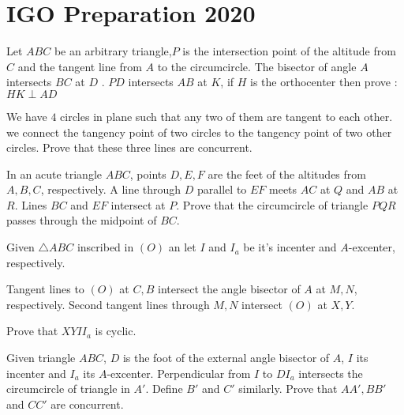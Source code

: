 \section*{IGO Preparation 2020}

\prob{}
{}{}{
    Let $ABC$ be an arbitrary triangle,$P$ is the intersection point of the altitude from
    $C$ and the tangent line from $A$ to the circumcircle. The bisector of angle $A$
    intersects $BC$ at $D$ . $PD$ intersects $AB$ at $K$, if $H$ is the orthocenter then
    prove : $HK\perp AD$
}

\prob{}
{}{}{
    We have $4$ circles in plane such that any two of them are tangent to each other. we
    connect the tangency point of two circles to the tangency point of two other circles.
    Prove that these three lines are concurrent.
}

\prob{}
{}{}{
    In an acute triangle $ABC$, points $D,E,F$ are the feet of the altitudes from $A,B,C$,
    respectively. A line through $D$ parallel to $EF$ meets $AC$ at $Q$ and $AB$ at $R$.
    Lines $BC$ and $EF$ intersect at $P$. Prove that the circumcircle of triangle $PQR$
    passes through the midpoint of $BC$.
}


\prob{}
{}{}{
    Given $\triangle ABC$ inscribed in $(O)$ an let $I$ and $I_a$ be it's incenter and
    $A$-excenter, respectively.

    Tangent lines to $(O)$ at $C,B$ intersect the angle bisector of $A$ at $M,N$, 
    respectively. Second tangent lines through $M,N$ intersect $(O)$ at $X,Y$.

    Prove that $XYII_a$ is cyclic.
}

\prob{}
{}{}{
    Given triangle $ABC$, $D$ is the foot of the external angle bisector of $A$, $I$ its
    incenter and $I_a$ its $A$-excenter. Perpendicular from $I$ to $DI_a$ intersects the
    circumcircle of triangle in $A'$. Define $B'$ and $C'$ similarly. Prove that $AA',BB'$
    and $CC'$ are concurrent.
}
